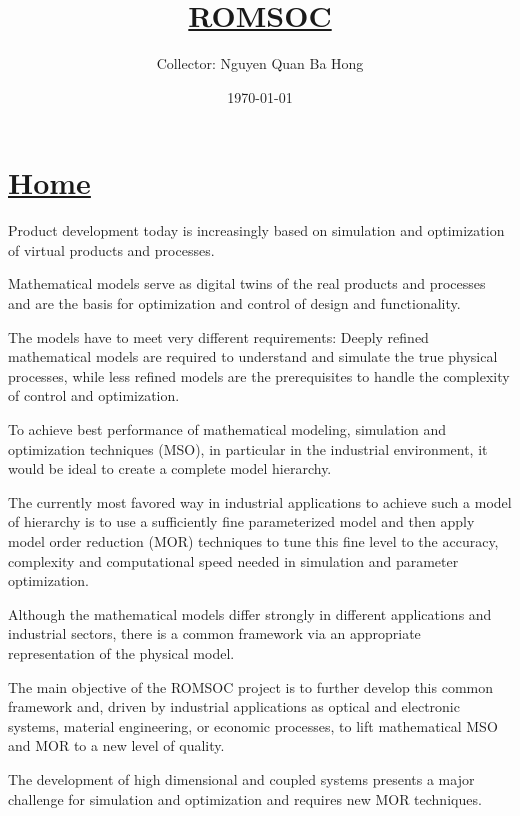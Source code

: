 \documentclass[onsided]{book}
\title{\href{https://www.romsoc.eu/}{ROMSOC}}
\author{Collector: Nguyen Quan Ba Hong}
\date{\today}
\numberwithin{equation}{section}
\begin{document}
\maketitle
\setcounter{secnumdepth}{6}
\setcounter{tocdepth}{6}
\tableofcontents


\chapter{\href{https://www.romsoc.eu/}{Home}}

Product development today is increasingly based on simulation and optimization of virtual products and processes.

Mathematical models serve as digital twins of the real products and processes and are the basis for optimization and control of design and functionality.

The models have to meet very different requirements: Deeply refined mathematical models are required to understand and simulate the true physical processes, while less refined models are the prerequisites to handle the complexity of control and optimization.

To achieve best performance of mathematical modeling, simulation and optimization techniques (MSO), in particular in the industrial environment, it would be ideal to create a complete model hierarchy.

%
The currently most favored way in industrial applications to achieve such a model of hierarchy is to use a sufficiently fine parameterized model and then apply model order reduction (MOR) techniques to tune this fine level to the accuracy, complexity and computational speed needed in simulation and parameter optimization.

%
Although the mathematical models differ strongly in different applications and industrial sectors, there is a common framework via an appropriate representation of the physical model.

%
The main objective of the ROMSOC project is to further develop this common framework and, driven by industrial applications as optical and electronic systems, material engineering, or economic processes, to lift mathematical MSO and MOR to a new level of quality.

The development of high dimensional and coupled systems presents a major challenge for simulation and optimization and requires new MOR techniques.
\end{document}

